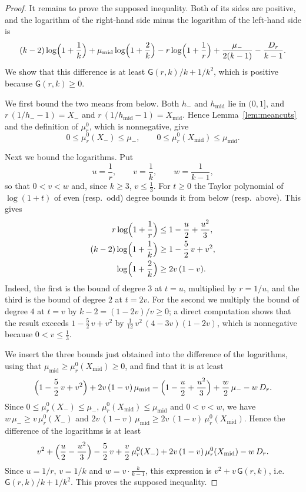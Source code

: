 \documentclass{amsart}
\theoremstyle{definition}
\theoremstyle{remark}
\numberwithin{equation}{section}
\begin{document}
\begin{proof}
It remains to prove the supposed inequality. Both of its sides are positive, and the logarithm of the right-hand side minus the logarithm of the left-hand side is
\[
(k-2)\log\Bigl(1+\frac1k\Bigr)+\mu_{\mathrm{mid}}\log\Bigl(1+\frac2k\Bigr)-r\log\Bigl(1+\frac1r\Bigr)+\frac{\mu_-}{2(k-1)}-\frac{D_r}{k-1}.
\]
We show that this difference is at least $\mathsf G(r,k)/k+1/k^2$, which is positive because $\mathsf G(r,k)\ge 0$.

We first bound the two means from below. Both $h_-$ and $h_{\mathrm{mid}}$ lie in $(0,1]$, and $r\,(1/h_--1)=X_-$ and $r\,(1/h_{\mathrm{mid}}-1)=X_{\mathrm{mid}}$. Hence Lemma~\ref{lem:meancuts} and the definition of $\mu^0_r$, which is nonnegative, give
\[
0\le\mu^0_r(X_-)\le\mu_-,\qquad 0\le\mu^0_r(X_{\mathrm{mid}})\le\mu_{\mathrm{mid}}.
\]

Next we bound the logarithms. Put
\[
u=\frac1r,\qquad v=\frac1k,\qquad w=\frac{1}{k-1},
\]
so that $0<v<w$ and, since $k\ge 3$, $v\le\frac13$. For $t\ge 0$ the Taylor polynomial of $\log(1+t)$ of even (resp.\ odd) degree bounds it from below (resp.\ above). This gives
\begin{align*}
r\log\Bigl(1+\frac1r\Bigr)&\le 1-\frac u2+\frac{u^2}{3},\\
(k-2)\log\Bigl(1+\frac1k\Bigr)&\ge 1-\frac52\,v+v^2,\\
\log\Bigl(1+\frac2k\Bigr)&\ge 2v\,(1-v).
\end{align*}
Indeed, the first is the bound of degree $3$ at $t=u$, multiplied by $r=1/u$, and the third is the bound of degree $2$ at $t=2v$. For the second we multiply the bound of degree $4$ at $t=v$ by $k-2=(1-2v)/v\ge 0$; a direct computation shows that the result exceeds $1-\frac52\,v+v^2$ by $\frac{1}{12}\,v^2\,(4-3v)(1-2v)$, which is nonnegative because $0<v\le\frac13$.

We insert the three bounds just obtained into the difference of the logarithms, using that $\mu_{\mathrm{mid}}\ge\mu^0_r(X_{\mathrm{mid}})\ge 0$, and find that it is at least
\[
\Bigl(1-\frac52\,v+v^2\Bigr)+2v\,(1-v)\,\mu_{\mathrm{mid}}-\Bigl(1-\frac u2+\frac{u^2}{3}\Bigr)+\frac w2\,\mu_--w\,D_r .
\]
Since $0\le\mu^0_r(X_-)\le\mu_-$, $\mu^0_r(X_{\mathrm{mid}})\le\mu_{\mathrm{mid}}$ and $0<v<w$, we have $w\,\mu_-\ge v\,\mu^0_r(X_-)$ and $2v\,(1-v)\,\mu_{\mathrm{mid}}\ge 2v\,(1-v)\,\mu^0_r(X_{\mathrm{mid}})$. Hence the difference of the logarithms is at least
\[
v^2+\Bigl(\frac u2-\frac{u^2}{3}\Bigr)-\frac52\,v+\frac v2\,\mu^0_r(X_-)+2v\,(1-v)\,\mu^0_r(X_{\mathrm{mid}})-w\,D_r .
\]
Since $u=1/r$, $v=1/k$ and $w=v\cdot\frac{k}{k-1}$, this expression is $v^2+v\,\mathsf G(r,k)$, i.e.\ $\mathsf G(r,k)/k+1/k^2$. This proves the supposed inequality.
\end{proof}
\end{document}
